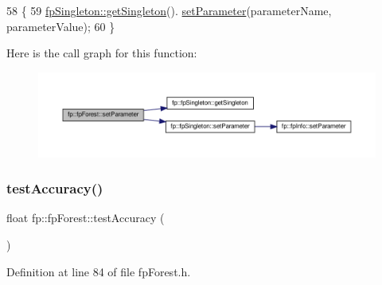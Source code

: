 \begin{DoxyCode}
58                                                                                               \{
59                 \hyperlink{classfp_1_1fpSingleton_a8bdae77b68521003e3fc630edec2e240}{fpSingleton::getSingleton}().
      \hyperlink{classfp_1_1fpSingleton_a90f275b256694ea7b16577d547a33044}{setParameter}(parameterName, parameterValue);    
60             \}
\end{DoxyCode}
Here is the call graph for this function\+:
\nopagebreak
\begin{figure}[H]
\begin{center}
\leavevmode
\includegraphics[width=350pt]{classfp_1_1fpForest_a8a083cc4cd4110dee2b6627d53529965_cgraph}
\end{center}
\end{figure}
\mbox{\label{classfp_1_1fpForest_a2ecaa11b48f37781f5fb4607ed6a490f}} 
\subsubsection{\texorpdfstring{test\+Accuracy()}{testAccuracy()}}
{\footnotesize\ttfamily float fp\+::fp\+Forest\+::test\+Accuracy (\begin{DoxyParamCaption}{ }\end{DoxyParamCaption})\hspace{0.3cm}{\ttfamily [inline]}}



Definition at line 84 of file fp\+Forest.\+h.


